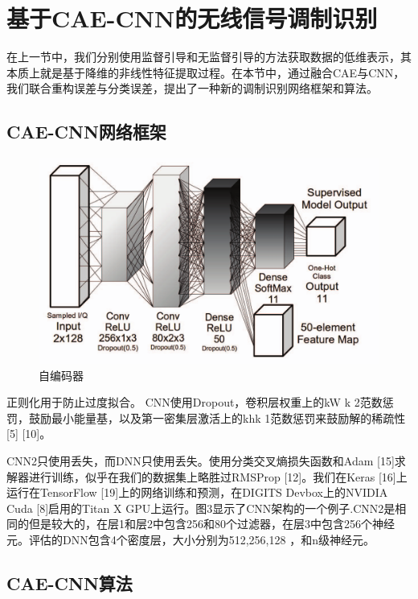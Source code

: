 \section{基于CAE-CNN的无线信号调制识别}

在上一节中，我们分别使用监督引导和无监督引导的方法获取数据的低维表示，其本质上就是基于降维的非线性特征提取过程。在本节中，通过融合CAE与CNN，我们联合重构误差与分类误差，提出了一种新的调制识别网络框架和算法。

\subsection{CAE-CNN网络框架}

\begin{figure}[!h]
	\centering
	\includegraphics[scale=0.3]{figures/chapter_3/cae_cnn_frame}
	\caption{自编码器}	\label{fig_3_2}
\end{figure}
正则化用于防止过度拟合。 CNN使用Dropout，卷积层权重上的kW k 2范数惩罚，鼓励最小能量基，以及第一密集层激活上的khk 1范数惩罚来鼓励解的稀疏性[5] [10]。 

CNN2只使用丢失，而DNN只使用丢失。使用分类交叉熵损失函数和Adam [15]求解器进行训练，似乎在我们的数据集上略胜过RMSProp [12]。我们在Keras [16]上运行在TensorFlow [19]上的网络训练和预测，在DIGITS Devbox上的NVIDIA Cuda [8]启用的Titan X GPU上运行。图3显示了CNN架构的一个例子.CNN2是相同的但是较大的，在层1和层2中包含256和80个过滤器，在层3中包含256个神经元。评估的DNN包含4个密度层，大小分别为512,256,128 ，和n级神经元。\par

\subsection{CAE-CNN算法}

